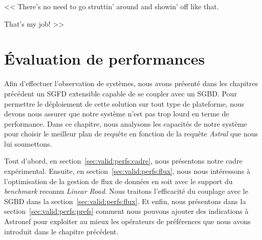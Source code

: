\begin{savequote}[6cm]
<< There's no need to go struttin' around and showin' off like that. 

\quad That's my job! >>
\end{savequote}

\chapter{Évaluation de performances}
\chaptertoc

Afin d'effectuer l'observation de systèmes, nous avons présenté dans les chapitres précédent un SGFD extensible capable de se coupler avec un SGBD. Pour permettre le déploiement de cette solution sur tout type de plateforme, nous devons nous assurer que notre système n'est pas trop lourd en terme de performance. Dans ce chapitre, nous analysons les capacités de notre système pour choisir le meilleur plan de requête en fonction de la requête \textit{Astral} que nous lui soumettons.

Tout d'abord, en section~\ref{sec:valid:perfs:cadre}, nous présentons notre cadre expérimental. Ensuite, en section~\ref{sec:valid:perfs:flux}, nous nous intéressons à l'optimisation de la gestion de flux de données en soit avec le support du \textit{benchmark} reconnu \textit{Linear Road}. Nous traitons l'efficacité du couplage avec le SGBD dans la section~\ref{sec:valid:perfs:flux}. Et enfin, nous présentons dans la section~\ref{sec:valid:perfs:prefs} comment nous pouvons ajouter des indications à Astronef pour exploiter au mieux les opérateurs de préférences que nous avons introduit dans le chapitre précédent.






